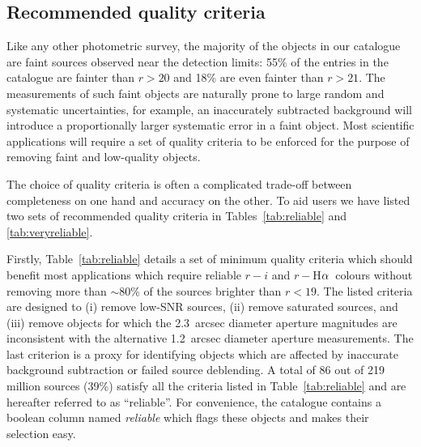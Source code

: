 \documentclass[useAMS,usenatbib]{mn2e}
\def\ha{\mbox{H$\rm \alpha$}}
\begin{document}
\subsection{Recommended quality criteria}
\label{sec:qualitycriteria}

Like any other photometric survey,
the majority of the objects in our catalogue
are faint sources observed near the detection limits:
55\% of the entries in the catalogue
are fainter than $r > 20$
and 18\% are even fainter than $r > 21$.
The measurements of such faint objects
are naturally prone to large
random and systematic uncertainties,
for example, an inaccurately subtracted background
will introduce a proportionally larger systematic error
in a faint object.
Most scientific applications will require a set of
quality criteria to be enforced for the purpose
of removing faint and low-quality objects.

The choice of quality criteria is often a complicated
trade-off between completeness on one hand
and accuracy on the other.
To aid users we have listed two sets of
recommended quality criteria 
in Tables~\ref{tab:reliable} and \ref{tab:veryreliable}.

Firstly, Table~\ref{tab:reliable} details
a set of minimum quality criteria
which should benefit most applications
which require reliable $r-i$ and $r-$\ha\ colours
without removing more than $\sim$80\%
of the sources brighter than $r < 19$.
The listed criteria are designed to 
(i) remove low-SNR sources, 
(ii) remove saturated sources,
and (iii) remove objects for which the 2.3~arcsec diameter
aperture magnitudes are inconsistent 
with the alternative 1.2~arcsec diameter aperture measurements.
The last criterion is a proxy
for identifying objects which are affected
by inaccurate background subtraction
or failed source deblending.
A total of 86 out of 219 million sources 
(39\%) satisfy all the criteria listed in Table~\ref{tab:reliable}
and are hereafter referred to as ``reliable''.
For convenience, the catalogue contains a boolean column
named \emph{reliable} which flags these objects
and makes their selection easy.
\end{document}
